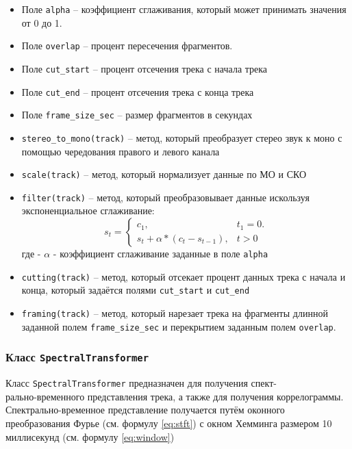\begin{itemize}
\item{Поле \texttt{alpha} -- коэффициент сглаживания, который может принимать значения от 0 до 1.}
\item{Поле \texttt{overlap} -- процент пересечения фрагментов.}
\item{Поле \texttt{cut\_start} -- процент отсечения трека с начала трека}
\item{Поле \texttt{cut\_end} -- процент отсечения трека с конца трека}
\item{Поле \texttt{frame\_size\_sec} -- размер фрагментов в секундах}
\item{\texttt{stereo\_to\_mono(track)} -- метод, который преобразует стерео звук к моно с помощью чередования правого и левого канала}
\item{\texttt{scale(track)} -- метод, который нормализует данные по МО и СКО}
\item{\texttt{filter(track)} -- метод, который преобразовывает данные искользуя экспоненциальное сглаживание:
\begin{equation}\label{eq:sfm}
s_t = \begin{cases} 
c_1, & t_1 = 0. \\
s_{t} + \alpha * (c_t - s_{t-1}), & t > 0
\end{cases} 
\end{equation}
где - $\alpha$ - коэффициент сглаживание заданные в поле \texttt{alpha}} \\
\item{\texttt{cutting(track)} -- метод, который отсекает процент данных трека с начала и конца, который задаётся полями \texttt{cut\_start} и \texttt{cut\_end}}
\item{\texttt{framing(track)} -- метод, который нарезает трека на фрагменты длинной заданной полем \texttt{frame\_size\_sec} и перекрытием заданным полем \texttt{overlap}.}
\end{itemize}


\subsubsection{Класс \texttt{SpectralTransformer}}

Класс \texttt{SpectralTransformer} предназначен для получения спект- \\ рально-временного представления трека, а также для получения коррелограммы. Спектрально-временное представление получается путём оконного преобразования Фурье (см. формулу \ref{eq:stft}) с окном Хемминга размером 10 миллисекунд (см. формулу \ref{eq:window})

